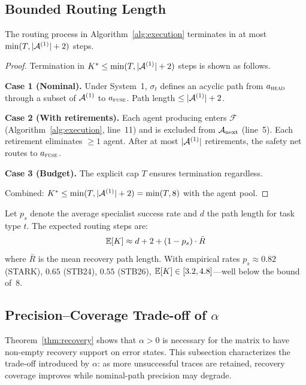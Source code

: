 \subsection{Bounded Routing Length}
\label{app:thm_convergence}

\begin{theorem}
\label{thm:convergence}
The routing process in Algorithm~\ref{alg:execution} terminates in at most $\min(T, |\mathcal{A}^{(1)}| + 2)$ steps.
\end{theorem}

\begin{proof}
Termination in $K^* \leq \min(T, |\mathcal{A}^{(1)}| + 2)$ steps is shown as follows.

\textbf{Case 1 (Nominal).}  Under System~1, $\sigma_t$ defines an acyclic path from $a_{\textnormal{\textsc{head}}}$ through a subset of $\mathcal{A}^{(1)}$ to $a_{\textnormal{\textsc{fuse}}}$.  Path length $\leq |\mathcal{A}^{(1)}| + 2$.

\textbf{Case 2 (With retirements).}  Each agent producing \sfail enters $\mathcal{F}$ (Algorithm~\ref{alg:execution}, line~11) and is excluded from $\mathcal{A}_\text{next}$ (line~5).  Each retirement eliminates $\geq 1$ agent.  After at most $|\mathcal{A}^{(1)}|$ retirements, the safety net routes to $a_{\textnormal{\textsc{fuse}}}$.

\textbf{Case 3 (Budget).}  The explicit cap $T$ ensures termination regardless.

Combined: $K^* \leq \min(T, |\mathcal{A}^{(1)}| + 2) = \min(T, 8)$ with the \starname{} agent pool.
\end{proof}

\begin{proposition}
\label{prop:steps}
Let $p_s$ denote the average specialist success rate and $d$ the path length for task type $t$.  The expected routing steps are:
\begin{equation}
    \mathbb{E}[K] \approx d + 2 + (1-p_s) \cdot \bar{R}
\end{equation}
where $\bar{R}$ is the mean recovery path length.  With empirical rates $p_s \approx 0.82$ (STARK), $0.65$ (STB24), $0.55$ (STB26), $\mathbb{E}[K] \in [3.2, 4.8]$---well below the bound of~8.
\end{proposition}

\subsection{Precision--Coverage Trade-off of $\alpha$}
\label{app:alpha}

Theorem~\ref{thm:recovery} shows that $\alpha > 0$ is necessary for the matrix to have non-empty recovery support on error states.
This subsection characterizes the trade-off introduced by $\alpha$: as more unsuccessful traces are retained, recovery coverage improves while nominal-path precision may degrade.

